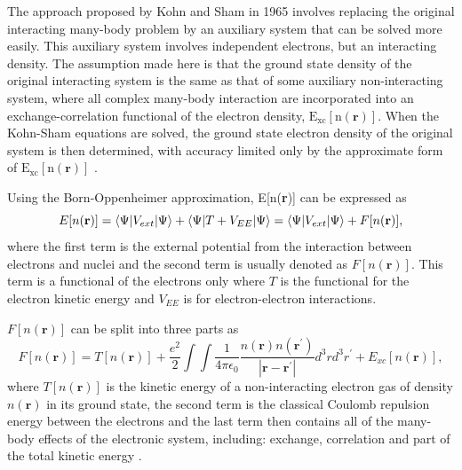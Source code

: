 \documentclass[11pt, twoside]{report}
\begin{document}
The approach proposed by Kohn and Sham in 1965 involves replacing the original interacting many-body problem by an auxiliary system that can be solved more easily. This auxiliary system involves independent electrons, but an interacting density. The assumption made here is that the ground state density of the original interacting system is the same as that of some auxiliary non-interacting system, where all complex many-body interaction are incorporated into an exchange-correlation functional of the electron density, $\mathrm{E_{xc}[n(\mathbf{r})]}$. When the Kohn-Sham equations are solved, the ground state electron density of the original system is then determined, with accuracy limited only by the approximate form of $\mathrm{E_{xc}[n(\mathbf{r})]}$ \cite{RichardMartin_Ch7}.

Using the Born-Oppenheimer approximation, E[n(\textbf{r})] can be expressed as
\begin{equation}\label{E_functional}
E[n(\mathbf{r})] = \braket{\Psi | V_{ext} | \Psi} +  \braket{\Psi | T + V_{EE} | \Psi} = \braket{\Psi | V_{ext} | \Psi} + F[n(\mathbf{r})],
\end{equation}
where the first term is the external potential from the interaction between electrons and nuclei and the second term is usually denoted as $F[n(\boldsymbol{r})]$. This term is a functional of the electrons only where $T$ is the functional for the electron kinetic energy and $V_{EE}$ is for electron-electron interactions.

$F[n(\boldsymbol{r})]$ can be split into three parts as 
\begin{equation}\label{F_functional}
F[n(\boldsymbol{r})] = T[n(\boldsymbol{r})] + \frac{e^2}{2}\int \int \frac{1}{4\pi \epsilon_0}\frac{n(\boldsymbol{r})n(\boldsymbol{r^{\prime}})}{|\boldsymbol{r} - \boldsymbol{r^{\prime}}|}d^3rd^3r^{\prime} + E_{xc}[n(\boldsymbol{r})],
\end{equation}
where $T[n(\boldsymbol{r})]$ is the kinetic energy of a non-interacting electron gas of density $n(\boldsymbol{r})$ in its ground state, the second term is the classical Coulomb repulsion energy between the electrons and the last term then contains all of the many-body effects of the electronic system, including: exchange, correlation and part of the total kinetic energy \cite{Prasad_ch3}.
\end{document}
